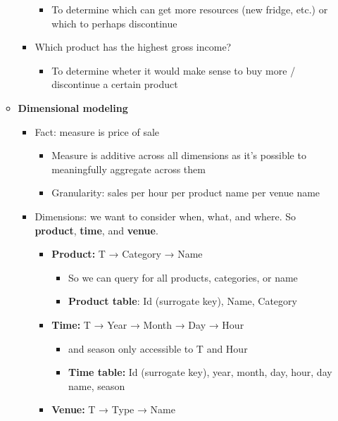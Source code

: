\begin{multicols}{2}
\begin{itemize}
\begin{itemize}
\begin{itemize}
      \begin{itemize}
            \item
        To determine which can get more resources (new fridge, etc.) or
        which to perhaps discontinue
      \end{itemize}
    \item
      Which product has the highest gross income?

      \begin{itemize}
            \item
        To determine wheter it would make sense to buy more /
        discontinue a certain product
      \end{itemize}
    \end{itemize}
  \item
    \textbf{Dimensional modeling}

    \begin{itemize}
        \item
      Fact: measure is price of sale

      \begin{itemize}
            \item
        Measure is additive across all dimensions as it's possible to
        meaningfully aggregate across them
      \item
        Granularity: sales per hour per product name per venue name
      \end{itemize}
    \item
      Dimensions: we want to consider when, what, and where. So
      \textbf{product}, \textbf{time}, and \textbf{venue}.

      \begin{itemize}
            \item
        \textbf{Product:} T → Category → Name

        \begin{itemize}
                \item
          So we can query for all products, categories, or name
        \item
          \textbf{Product table}: Id (surrogate key), Name, Category
        \end{itemize}
      \item
        \textbf{Time:} T → Year → Month → Day → Hour

        \begin{itemize}
                \item
          and season only accessible to T and Hour
        \item
          \textbf{Time table:} Id (surrogate key), year, month, day,
          hour, day name, season
        \end{itemize}
      \item
        \textbf{Venue:} T → Type → Name


\end{itemize}
\end{itemize}
\end{itemize}
\end{itemize}
\end{multicols}

